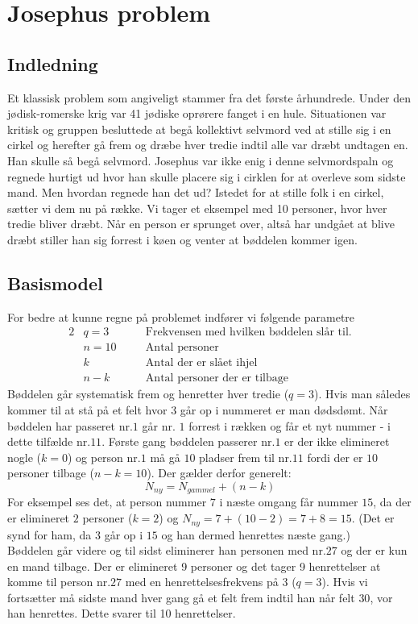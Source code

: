 \chapter{Josephus problem}
\section{Indledning}
Et klassisk problem som angiveligt stammer fra det første århundrede. Under den jødisk-romerske krig var 41 jødiske oprørere fanget i en hule. Situationen var kritisk og gruppen besluttede at begå kollektivt selvmord ved at stille sig i en cirkel og herefter gå frem og dræbe hver tredie indtil alle var dræbt undtagen en. Han skulle så begå selvmord. Josephus var ikke enig i denne selvmordspaln og regnede hurtigt ud hvor han skulle placere sig i cirklen for at overleve som sidste mand. Men hvordan regnede han det ud?
Istedet for at stille folk i en cirkel, sætter vi dem nu på række. Vi tager et eksempel med 10 personer, hvor hver tredie bliver dræbt. Når en person er sprunget over, altså har undgået at blive dræbt stiller han sig forrest i køen og venter at bøddelen kommer igen.
\section{Basismodel}
For bedre at kunne regne på problemet indfører vi følgende parametre
\begin{alignat*}{2}
&q=3 \quad &&\text{Frekvensen med hvilken bøddelen slår til.}\\
&n=10 \quad &&\text{Antal personer}\\
&k \quad &&\text{Antal der er slået ihjel}\\
&n-k \quad &&\text{Antal personer der er tilbage}
\end{alignat*}
Bøddelen går systematisk frem og henretter hver tredie (\(q=3\)). Hvis man således kommer til at stå på et felt hvor 3 går op i nummeret er man dødsdømt. Når bøddelen har passeret nr.\(1\) går nr. \(1\) forrest i rækken og får et nyt nummer - i dette tilfælde nr.\(11\). Første gang bøddelen passerer nr.\(1\) er der ikke elimineret nogle (\(k=0\)) og person nr.\(1\) må gå \(10\) pladser frem til nr.\(11\) fordi der er \(10\) personer tilbage (\(n-k=10\)). Der gælder derfor generelt:
\begin{equation}
N_{ny}=N_{gammel}+(n-k)\label{Nny}
\end{equation}
For eksempel ses det, at person nummer \(7\) i næste omgang får nummer \(15\), da der er elimineret \(2\) personer (\(k=2\)) og \(N_{ny}=7+(10-2)=7+8=15\). (Det er synd for ham, da 3 går op i \(15\) og han dermed henrettes næste gang.)\\
Bøddelen går videre og til sidst eliminerer han personen med nr.\(27\) og der er kun en mand tilbage. Der er elimineret 9 personer og det tager 9 henrettelser at komme til person nr.\(27\) med en henrettelsesfrekvens på 3 (\(q=3\)). Hvis vi fortsætter må sidste mand hver gang gå et felt frem indtil han når felt \(30\), vor han henrettes. Dette svarer til 10 henrettelser.
